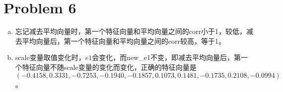 \documentclass[a4paper,UTF8]{article}
\numberwithin{equation}{section}
\begin{document}
\section*{Problem 6}
\begin{enumerate}[(a)]
    \item 忘记减去平均向量时，第一个特征向量和平均向量之间的corr小于1，较低，减去平均向量后，第一个特征向量和平均向量之间的corr较高，等于1。
    \item scale变量取值变化时，$e1$会变化，而new\_e1不变，即减去平均向量后，第一个特征向量不随scale变量的变化而变化，正确的特征向量是$$(-0.4158,0.3331,-0.7253,-0.1940,-0.1857,0.1073,0.1481,-0.1735,0.2108,-0.0994)$$。
\end{enumerate}
\end{document}
